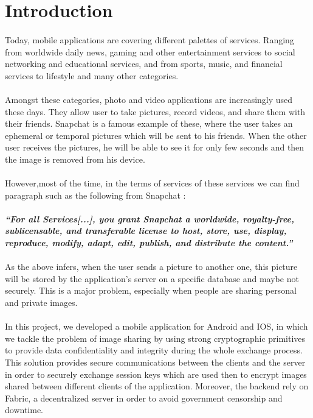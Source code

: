 \section{Introduction}
   \paragraph{}
    Today, mobile applications are covering different palettes of services. Ranging from worldwide daily news, gaming and other entertainment services to social networking and educational services, and from sports, music, and financial services to lifestyle and many other categories.
   \paragraph{}
    Amongst these categories, photo and video applications are increasingly used these days. They allow user to take pictures, record videos, and share them with their friends. Snapchat is a famous example of these, where the user takes an ephemeral or temporal pictures which will be sent to his friends. When the other user receives the pictures, he will be able to see it for only few seconds and then the image is removed from his device.
    \paragraph{}
    However,most of the time, in the terms of services of these services we can find paragraph such as the following from Snapchat :
    \paragraph{}
    \textbf{\textit{\enquote{For all Services[...], you grant Snapchat a worldwide, royalty-free, sublicensable, and transferable license to host, store, use, display, reproduce, modify, adapt, edit, publish, and distribute the content.}}}
    \paragraph{}
    As the above infers, when the user sends a picture to another one, this picture will be stored by the application's server on a specific database and maybe not securely. This is a major problem, especially when people are sharing personal and private images.
    \paragraph{}
    In this project, we developed a mobile application for Android and IOS, in which we tackle the problem of image sharing by using strong cryptographic primitives to provide data confidentiality and integrity during the whole exchange process. This solution provides secure communications between the clients and the server in order to securely exchange session keys which are used then to encrypt images shared between different clients of the application. Moreover, the backend rely on Fabric, a decentralized server in order to avoid government censorship and downtime.
